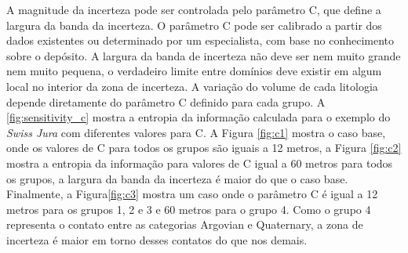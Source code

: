 A magnitude da incerteza pode ser controlada pelo parâmetro C, que define a largura da banda da incerteza. O parâmetro C pode ser calibrado a partir dos dados existentes ou determinado por um especialista, com base no conhecimento sobre o depósito. A largura da banda de incerteza não deve ser nem muito grande nem muito pequena, o verdadeiro limite entre domínios deve existir em algum local no interior da zona de incerteza. A variação do volume de cada litologia depende diretamente do parâmetro C definido para cada grupo. A \autoref{fig:sensitivity_c} mostra a entropia da informação calculada para o exemplo do \textit{Swiss Jura} com diferentes valores para C. A Figura \autoref{fig:c1} mostra o caso base, onde os valores de C para todos os grupos são iguais a 12 metros, a Figura \autoref{fig:c2} mostra a entropia da informação para valores de C igual a 60 metros para todos os grupos, a largura da banda da incerteza é maior do que o caso base. Finalmente, a Figura\autoref{fig:c3} mostra um caso onde o parâmetro C é igual a 12 metros para os grupos 1, 2 e 3 e 60 metros para o grupo 4. Como o grupo 4 representa o contato entre as categorias Argovian e Quaternary, a zona de incerteza é maior em torno desses contatos do que nos demais.

